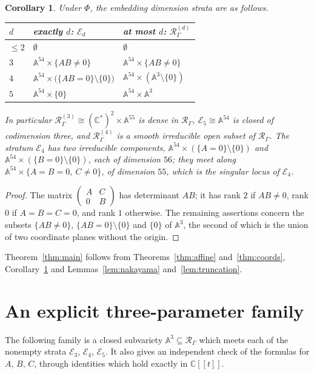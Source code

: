 \documentclass{amsart}
\newtheorem{corollary}[theorem]{Corollary}
\theoremstyle{definition}
\theoremstyle{remark}
\numberwithin{equation}{section}
\newcommand{\CC}{\mathbb{C}}
\newcommand{\AF}{\mathbb{A}}
\newcommand{\Rs}{\mathcal{R}_\Gamma}
\newcommand{\Rd}[1]{\mathcal{R}^{(#1)}_\Gamma}
\newcommand{\Ed}[1]{\mathcal{E}_{#1}}
\newcommand{\ps}{[\![t]\!]}
\begin{document}
\begin{corollary}\label{cor:strata}
Under $\Phi$, the embedding dimension strata are as follows.
\begin{center}
\begin{tabular}{@{}lll@{}}
\toprule
$d$ & exactly $d$: $\Ed{d}$ & at most $d$: $\Rd{d}$\\
\midrule
$\le2$ & $\emptyset$ & $\emptyset$\\
$3$ & $\AF^{54}\times\{AB\neq0\}$ & $\AF^{54}\times\{AB\neq0\}$\\
$4$ & $\AF^{54}\times\bigl(\{AB=0\}\setminus\{0\}\bigr)$ & $\AF^{54}\times(\AF^3\setminus\{0\})$\\
$5$ & $\AF^{54}\times\{0\}$ & $\AF^{54}\times\AF^3$\\
\bottomrule
\end{tabular}
\end{center}
In particular $\Rd{3}\cong(\CC^*)^2\times\AF^{55}$ is dense in $\Rs$, $\Ed{5}\cong\AF^{54}$ is closed of codimension three, and $\Rd{4}$ is a smooth irreducible open subset of $\Rs$. The stratum $\Ed{4}$ has two irreducible components, $\AF^{54}\times(\{A=0\}\setminus\{0\})$ and $\AF^{54}\times(\{B=0\}\setminus\{0\})$, each of dimension $56$; they meet along $\AF^{54}\times\{A=B=0,\ C\ne0\}$, of dimension $55$, which is the singular locus of $\Ed{4}$.
\end{corollary}

\begin{proof}
The matrix $\left(\begin{smallmatrix}A&C\\0&B\end{smallmatrix}\right)$ has determinant $AB$; it has rank $2$ if $AB\ne0$, rank $0$ if $A=B=C=0$, and rank $1$ otherwise. The remaining assertions concern the subsets $\{AB\ne0\}$, $\{AB=0\}\setminus\{0\}$ and $\{0\}$ of $\AF^3$, the second of which is the union of two coordinate planes without the origin.
\end{proof}

Theorem~\ref{thm:main} follows from Theorems~\ref{thm:affine} and~\ref{thm:coords}, Corollary~\ref{cor:strata} and Lemmas~\ref{lem:nakayama} and~\ref{lem:truncation}.

\section{An explicit three-parameter family}\label{sec:family}

The following family is a closed subvariety $\AF^3\subseteq\Rs$ which meets each of the nonempty strata $\Ed{3}$, $\Ed{4}$, $\Ed{5}$. It also gives an independent check of the formulas for $A$, $B$, $C$, through identities which hold exactly in $\CC\ps$.
\end{document}
